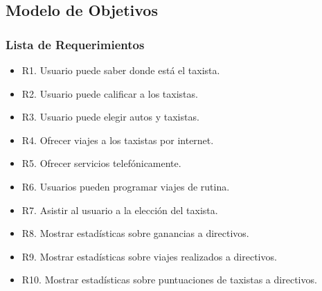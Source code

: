 \subsection{Modelo de Objetivos}
\subsubsection{Lista de Requerimientos}
	\begin{itemize}
		\item R1. Usuario puede saber donde está el taxista.
		\item R2. Usuario puede calificar a los taxistas.
		\item R3. Usuario puede elegir autos y taxistas.
		\item R4. Ofrecer viajes a los taxistas por internet.
		\item R5. Ofrecer servicios telefónicamente.
		\item R6. Usuarios pueden programar viajes de rutina.
		\item R7. Asistir al usuario a la elección del taxista.
		\item R8. Mostrar estadísticas sobre ganancias a directivos.
		\item R9. Mostrar estadísticas sobre viajes realizados a directivos.
		\item R10. Mostrar estadísticas sobre puntuaciones de taxistas a directivos.
	
	\end{itemize}
